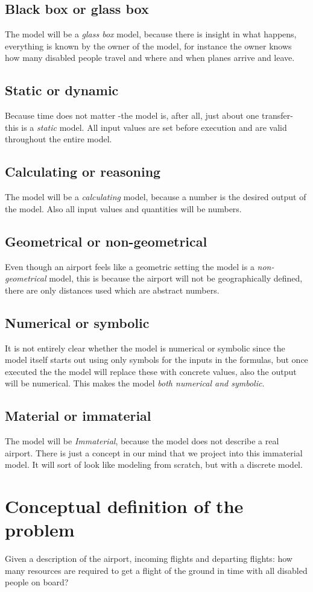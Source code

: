 \documentclass[a4paper, 11pt, notitlepage]{report}
\begin{document}
\subsection{Black box or glass box}
The model will be a \emph{glass box} model, because there is insight in what happens, everything is known by the owner of the model, for instance the owner knows how many disabled people travel and where and when planes arrive and leave.
\subsection{Static or dynamic}
Because time does not matter -the model is, after all, just about one transfer- this is a \emph{static} model. All input values are set before execution and are valid throughout the entire model.
\subsection{Calculating or reasoning}
The model will be a \emph{calculating} model, because a number is the desired output of the model. Also all input values and quantities will be numbers.
\subsection{Geometrical or non-geometrical}
Even though an airport feels like a geometric setting the model is a \emph{non-geometrical} model, this is because the airport will not be geographically defined, there are only distances used which are abstract numbers.
\subsection{Numerical or symbolic}
It is not entirely clear whether the model is numerical or symbolic since the model itself starts out using only symbols for the inputs in the formulas, but once executed the the model will replace these with concrete values, also the output will be numerical. This makes the model \emph{both numerical and symbolic}.
\subsection{Material or immaterial}
The model will be \emph{Immaterial}, because the model does not describe a real airport. There is just a concept in our mind that we project into this immaterial model. It will sort of look like modeling from scratch, but with a discrete model.
\section{Conceptual definition of the problem}
Given a description of the airport, incoming flights and departing flights: how many resources are required to get a flight of the ground in time with all disabled people on board?
\end{document}
